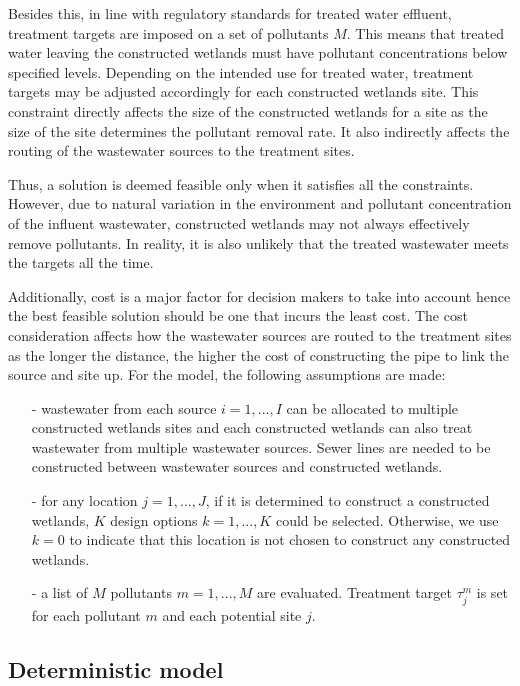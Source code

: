 \documentclass[preprint,12pt,authoryear]{elsarticle}
\begin{document}
Besides this, in line with regulatory standards for treated water effluent, treatment targets are imposed on a set of pollutants $M$. This means that treated water leaving the constructed wetlands must have pollutant concentrations below specified levels. Depending on the intended use for treated water, treatment targets may be adjusted accordingly for each constructed wetlands site. This constraint directly affects the size of the constructed wetlands for a site as the size of the site determines the pollutant removal rate. It also indirectly affects the routing of the wastewater sources to the treatment sites. 

Thus, a solution is deemed feasible only when it satisfies all the constraints. However, due to natural variation in the environment and pollutant concentration of the influent wastewater, constructed wetlands may not always effectively remove pollutants. In reality, it is also unlikely that the treated wastewater meets the targets all the time. 

Additionally, cost is a major factor for decision makers to take into account hence the best feasible solution should be one that incurs the least cost. The cost consideration affects how the wastewater sources are routed to the treatment sites as the longer the distance, the higher the cost of constructing the pipe to link the source and site up. For the model, the following assumptions are made:

\begin{itemize}
	\setlength{\itemsep}{0pt}
	\setlength{\parskip}{0pt}
	\setlength{\parsep}{0pt}
	\item[-] wastewater from each source $i=1,...,I$ can be allocated to multiple constructed wetlands sites and each constructed wetlands can also treat wastewater from multiple wastewater sources. Sewer lines are needed to be constructed between wastewater sources and constructed wetlands. 
	\item[-] for any location $j=1,...,J$, if it is determined to construct a constructed wetlands, $K$ design options $k=1,...,K$ could be selected. Otherwise, we use $k=0$ to indicate that this location is not chosen to construct any constructed wetlands. 
	\item[-] a list of $M$ pollutants $m=1,...,M$ are evaluated. Treatment target $\tau_j^m$ is set for each pollutant $m$ and each potential site $j$.
\end{itemize}

\subsection{Deterministic model}\label{detmodel}
\end{document}
